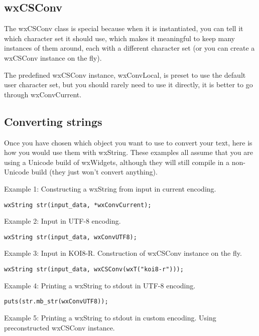 \subsection{wxCSConv}\label{wxcsconvclass}

The wxCSConv class is special because when it is instantiated, you can tell it
which character set it should use, which makes it meaningful to keep many
instances of them around, each with a different character set (or you can
create a wxCSConv instance on the fly).

The predefined wxCSConv instance, wxConvLocal, is preset to use the
default user character set, but you should rarely need to use it directly,
it is better to go through wxConvCurrent.

\subsection{Converting strings}\label{convertingstrings}

Once you have chosen which object you want to use to convert your text,
here is how you would use them with wxString. These examples all assume
that you are using a Unicode build of wxWidgets, although they will still
compile in a non-Unicode build (they just won't convert anything).

Example 1: Constructing a wxString from input in current encoding.

\begin{verbatim}
wxString str(input_data, *wxConvCurrent);
\end{verbatim}

Example 2: Input in UTF-8 encoding.

\begin{verbatim}
wxString str(input_data, wxConvUTF8);
\end{verbatim}

Example 3: Input in KOI8-R. Construction of wxCSConv instance on the fly.

\begin{verbatim}
wxString str(input_data, wxCSConv(wxT("koi8-r")));
\end{verbatim}

Example 4: Printing a wxString to stdout in UTF-8 encoding.

\begin{verbatim}
puts(str.mb_str(wxConvUTF8));
\end{verbatim}

Example 5: Printing a wxString to stdout in custom encoding.
Using preconstructed wxCSConv instance.

